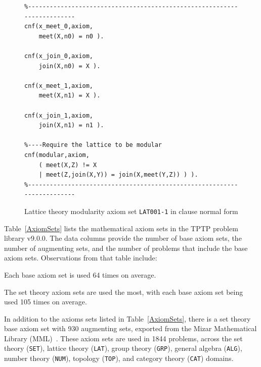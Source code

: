 \documentclass[runningheads]{llncs}
\newenvironment{packed_itemize}{
\vspace*{-0.2em}
\begin{itemize}
\setlength{\partopsep}{0pt}
\setlength{\itemsep}{1pt}
\setlength{\parskip}{0pt}
\setlength{\parsep}{0pt}
}{\end{itemize}}
\begin{document}
\begin{figure}[tb]
\centering
{\footnotesize
{\setlength{\baselineskip}{3mm}
\begin{verbatim}
%------------------------------------------------------------------------
cnf(x_meet_0,axiom,
    meet(X,n0) = n0 ).

cnf(x_join_0,axiom,
    join(X,n0) = X ).

cnf(x_meet_1,axiom,
    meet(X,n1) = X ).

cnf(x_join_1,axiom,
    join(X,n1) = n1 ).

%----Require the lattice to be modular
cnf(modular,axiom,
    ( meet(X,Z) != X
    | meet(Z,join(X,Y)) = join(X,meet(Y,Z)) ) ).
%------------------------------------------------------------------------
\end{verbatim}
}}
\caption{Lattice theory modularity axiom set {\tt LAT001-1} in clause normal form}
\label{ExampleAxioms1}
\end{figure}

Table~\ref{AxiomSets} lists the mathematical axiom sets in the TPTP problem library v9.0.0.
The data columns provide the number of base axiom sets, the number of augmenting sets, and
the number of problems that include the base axiom sets.
Observations from that table include:
\begin{packed_itemize}
\item Each base axiom set is used 64 times on average.
\item The set theory axiom sets are used the most, with each base axiom set being used 105
      times on average.
\end{packed_itemize}

In addition to the axioms sets listed in Table~\ref{AxiomSets}, there is a set theory base axiom
set with 930 augmenting sets, exported from the Mizar Mathematical Library (MML)~\cite{Urb06}.
These axiom sets are used in 1844 problems, across the set theory ({\tt SET}), lattice theory 
({\tt LAT}), group theory ({\tt GRP}), general algebra ({\tt ALG}), number theory ({\tt NUM}), 
topology ({\tt TOP}), and category theory ({\tt CAT}) domains.
\end{document}
